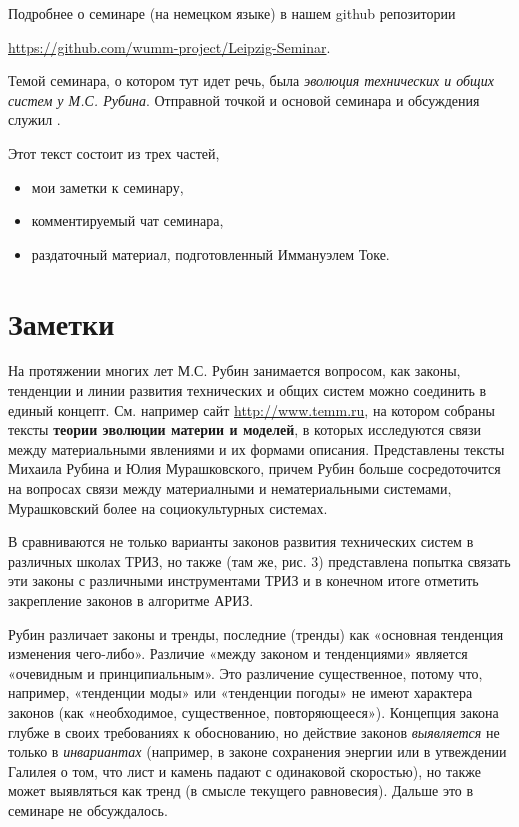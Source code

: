 \documentclass[a4paper,11pt]{article}
\begin{document}
Подробнее о семинаре (на немецком языке) в нашем github репозитории
\begin{center}
  \url{https://github.com/wumm-project/Leipzig-Seminar}.
\end{center}

Темой семинара, о котором тут идет речь, была \emph{эволюция технических и
  общих систем у М.С. Рубина}. Отправной точкой и основой семинара и
обсуждения служил \cite{Rubin2019}.

Этот текст состоит из трех частей,
\begin{itemize}[noitemsep]
\item мои заметки к семинару,
\item комментируемый чат семинара,
\item раздаточный материал, подготовленный Иммануэлем Токе.
\end{itemize}

\section{Заметки}

На протяжении многих лет М.С. Рубин занимается вопросом, как законы,
тенденции и линии развития технических и общих систем можно соединить в единый
концепт. См. например сайт \url{http://www.temm.ru}, на котором собраны тексты
\textbf{теории эволюции материи и моделей}, в которых исследуются связи между
материальными явлениями и их формами описания. Представлены тексты Михаила
Рубина и Юлия Мурашковского, причем Рубин больше сосредоточится на вопросах
связи между материалными и нематериальными системами, Мурашковский более на
социокультурных системах. 

В \cite{Rubin2019} сравниваются не только варианты законов развития
технических систем в различных школах ТРИЗ, но также (там же, рис. 3)
представлена попытка связать эти законы с различными инструментами ТРИЗ и в
конечном итоге отметить закрепление законов в алгоритме АРИЗ.

Рубин различает законы и тренды, последние (тренды) как «основная тенденция
изменения чего-либо». Различие «между законом и тенденциями» является
«очевидным и принципиальным». Это различение существенное, потому что,
например, «тенденции моды» или «тенденции погоды» не имеют характера законов
(как «необходимое, существенное, повторяющееся»).  Концепция закона глубже в
своих требованиях к обоснованию, но действие законов \emph{выявляется} не
только в \emph{инвариантах} (например, в законе сохранения энергии или в
утвеждении Галилея о том, что лист и камень падают с одинаковой скоростью), но
также может выявляться  как тренд (в смысле текущего равновесия). Дальше это в 
семинаре не обсуждалось. 
\end{document}
